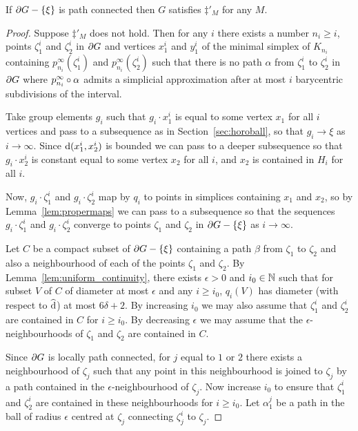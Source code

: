 \documentclass[a4paper]{article}
\begin{document}
\begin{proposition}
  If $\partial G - \left\{\xi\right\}$ is path connected then $G$ satisfies $\ddag'_M$
  for any $M$.
\end{proposition}

\begin{proof}
  Suppose $\ddag'_M$ does not hold. Then for any $i$ there exists a number $n_i
  \geq i$, points $\zeta_1^i$ and $\zeta_2^i$ in $\partial G$ and vertices
  $x_1^i$ and $y_1^i$ of the minimal simplex of $K_{n_i}$ containing 
  $p^\infty_{n_i}(\zeta^i_1)$ and $p^\infty_{n_i}(\zeta^i_2)$ such that there
  is no path $\alpha$ from $\zeta_1^i$ to $\zeta_2^i$ in $\partial G$ where
  $p^\infty_{n_i}\circ\alpha$ admits a simplicial approximation after at
  most $i$ barycentric subdivisions of the interval.

  Take group elements $g_i$ such that $g_i\cdot x_1^i$ is equal to some vertex
  $x_1$ for all $i$ vertices and pass to a subsequence as in
  Section~\ref{sec:horoball}, so that $g_i\to\xi$ as $i \to\infty$. Since
  $\operatorname{d}(x_1^i, x_2^i)$ is bounded we can pass to a deeper subsequence so that
  $g_i\cdot x_2^i$ is constant equal to some vertex $x_2$ for all $i$, and
  $x_2$ is contained in $H_i$ for all $i$. 

  Now, $g_i\cdot \zeta_1^i$ and $g_i\cdot\zeta_2^i$ map by $q_i$ to points in
  simplices containing $x_1$ and $x_2$, so by Lemma~\ref{lem:propermaps} we
  can pass to a subsequence so that the sequences $g_i\cdot \zeta_1^i$ and
  $g_i\cdot\zeta_2^i$ converge to points $\zeta_1$ and $\zeta_2$ in $\partial
  G - \left\{\xi\right\}$ as $i \to \infty$.
  
  Let $C$ be a compact subset of $\partial G - \left\{\xi\right\}$ containing a path
  $\beta$ from $\zeta_1$ to $\zeta_2$ and also a neighbourhood of each of the
  points $\zeta_1$ and $\zeta_2$. By Lemma~\ref{lem:uniform_continuity}, there
  exists $\epsilon > 0$ and $i_0 \in \mathbb{N}$ such that for subset $V$ of
  $C$ of diameter at most $\epsilon$ and any $i \geq i_0$, $q_i(V)$ has
  diameter (with respect to $\operatorname{\widehat{d}}$) at most $6\delta+2$. By increasing
  $i_0$ we may also assume that $\zeta_1^i$ and $\zeta_2^i$ are contained in
  $C$ for $i \geq i_0$. By decreasing $\epsilon$ we may assume that the
  $\epsilon$-neighbourhoods of $\zeta_1$ and $\zeta_2$ are contained in $C$. 

  Since $\partial G$ is locally path connected, for $j$ equal to $1$ or $2$
  there exists a neighbourhood of $\zeta_j$ such that any point in this
  neighbourhood is joined to $\zeta_j$ by a path contained in the
  $\epsilon$-neighbourhood of $\zeta_j$. Now increase $i_0$ to ensure that
  $\zeta_1^i$ and $\zeta_2^i$ are contained in these neighbourhoods for $i \geq
  i_0$. Let $\alpha_1^j$ be a path in the ball of radius $\epsilon$ centred at
  $\zeta_j$ connecting $\zeta_j^i$ to $\zeta_j$.


\end{proof}
\end{document}
